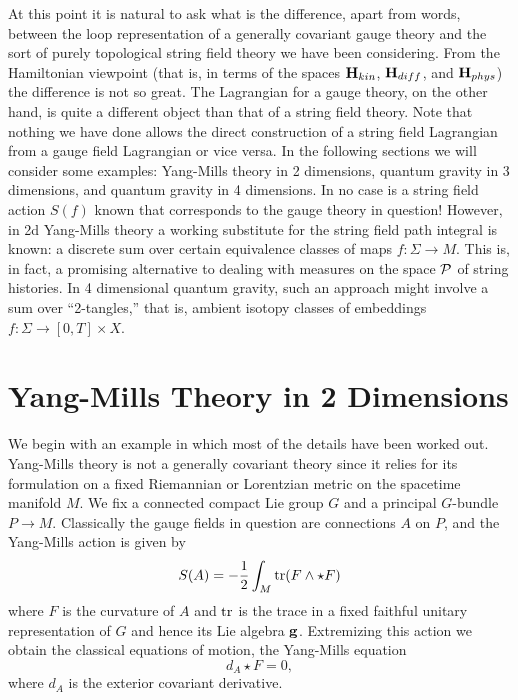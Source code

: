 \documentclass[12pt]{article}
\newcommand{\maps}{\colon}
\renewcommand{\P}{{\cal P}}
\renewcommand{\H}{{\bf H}}
\newcommand{\g}{{\bf  g}}	%
\newcommand{\hf}{{1\over 2}}
\newcommand{\tr}{{\rm tr}}
\begin{document}
At this point it is natural to ask what is the difference, apart from
words, between the loop representation of a generally covariant gauge
theory and the sort of purely topological string field theory we have been
considering.   From the Hamiltonian viewpoint (that is, in terms of the
spaces $\H_{kin}$, $\H_{diff}$, and $\H_{phys}$) the difference is not so
great.  The Lagrangian for a gauge theory, on the other hand, is quite a
different object than that of a string field theory. Note that nothing we
have done allows the direct construction of a string field Lagrangian from
a gauge field Lagrangian or vice versa. In the following sections we will
consider some examples:  Yang-Mills theory in 2 dimensions, quantum gravity
in 3 dimensions, and quantum gravity in 4 dimensions.  In no case is a
string field action $S(f)$ known that corresponds to the gauge theory in
question!    However, in 2d Yang-Mills theory a working substitute for the
string field path integral is known: a discrete sum over certain
equivalence classes of maps $f \maps \Sigma \to M$.  This is, in fact, a
promising alternative to dealing with measures on the space $\P$ of string
histories.   In 4 dimensional quantum gravity, such an approach might
involve a sum over ``2-tangles,'' that is, ambient isotopy classes of
embeddings $f \maps \Sigma \to [0,T] \times X$.

\section{Yang-Mills Theory in 2 Dimensions}

We begin with an example in which most of the details have been worked out.
Yang-Mills theory is not a generally covariant theory since it relies for
its formulation on a fixed Riemannian or Lorentzian metric on the spacetime
manifold $M$.  We fix a connected compact Lie group $G$ and a principal
$G$-bundle $P \to M$.  Classically the gauge fields in question are
connections $A$ on $P$, and the Yang-Mills action is given by
\[         S(A) =   -\hf \int_M \tr(F\wedge\star F)   \]
where $F$ is the curvature of $A$ and $\tr$ is the trace in a fixed
faithful unitary representation of $G$ and hence its Lie algebra $\g$.
Extremizing this action we obtain the classical equations of motion, the
Yang-Mills equation
\[           d_A \star F = 0, \]
where $d_A$ is the exterior covariant derivative.
\end{document}
